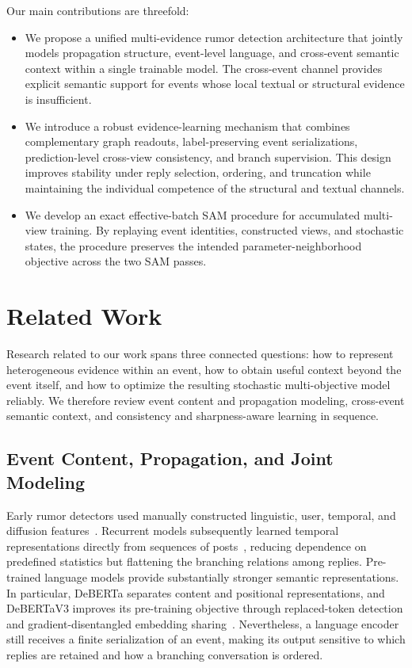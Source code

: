 \documentclass[sigconf,anonymous,review]{../acmart/acmart}
\begin{document}
Our main contributions are threefold:

\begin{itemize}
  \item We propose a unified multi-evidence rumor detection architecture that
  jointly models propagation structure, event-level language, and cross-event
  semantic context within a single trainable model. The cross-event channel
  provides explicit semantic support for events whose local textual or
  structural evidence is insufficient.

  \item We introduce a robust evidence-learning mechanism that combines
  complementary graph readouts, label-preserving event serializations,
  prediction-level cross-view consistency, and branch supervision. This
  design improves stability under reply selection, ordering, and truncation
  while maintaining the individual competence of the structural and textual
  channels.

  \item We develop an exact effective-batch SAM procedure for accumulated
  multi-view training. By replaying event identities, constructed views, and
  stochastic states, the procedure preserves the intended
  parameter-neighborhood objective across the two SAM passes.
\end{itemize}

\section{Related Work}

Research related to our work spans three connected questions: how to represent
heterogeneous evidence within an event, how to obtain useful context beyond
the event itself, and how to optimize the resulting stochastic multi-objective
model reliably. We therefore review event content and propagation modeling,
cross-event semantic context, and consistency and sharpness-aware learning in
sequence.

\subsection{Event Content, Propagation, and Joint Modeling}

Early rumor detectors used manually constructed linguistic, user, temporal,
and diffusion features~\cite{castillo2011credibility,ma2015svmts}. Recurrent
models subsequently learned temporal representations directly from sequences
of posts~\cite{ma2016rnn}, reducing dependence on predefined statistics but
flattening the branching relations among replies. Pre-trained language models
provide substantially stronger semantic representations. In particular,
DeBERTa separates content and positional representations, and DeBERTaV3
improves its pre-training objective through replaced-token detection and
gradient-disentangled embedding sharing~\cite{he2021deberta,
he2023debertav3}. Nevertheless, a language encoder still receives a finite
serialization of an event, making its output sensitive to which replies are
retained and how a branching conversation is ordered.
\end{document}
